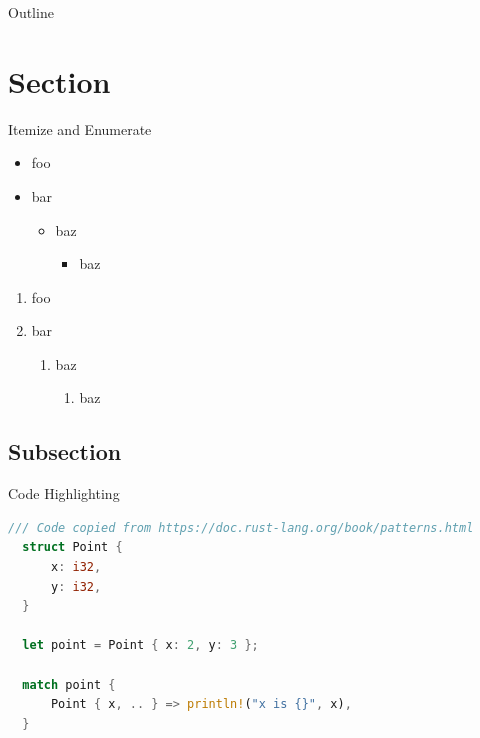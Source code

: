 
\begin{frame}[plain]
  \titlepage
\end{frame}

\begin{frame}{Outline}
\tableofcontents
\end{frame}

\section{Section}


\begin{frame}{Itemize and Enumerate}
    \begin{itemize}
      \item foo
      \item bar
        \begin{itemize}
          \item baz
            \begin{itemize}
              \item baz
            \end{itemize}
        \end{itemize}
    \end{itemize}
    \begin{enumerate}
      \item foo
      \item bar
        \begin{enumerate}
          \item baz
            \begin{enumerate}
              \item baz
            \end{enumerate}
        \end{enumerate}
    \end{enumerate}
\end{frame}

\subsection{Subsection}
\begin{frame}[fragile]{Code Highlighting}
  \begin{lstlisting}[autogobble, language=Rust]
  /// Code copied from https://doc.rust-lang.org/book/patterns.html
  struct Point {
      x: i32,
      y: i32,
  }

  let point = Point { x: 2, y: 3 };

  match point {
      Point { x, .. } => println!("x is {}", x),
  }
  \end{lstlisting}
\end{frame}


